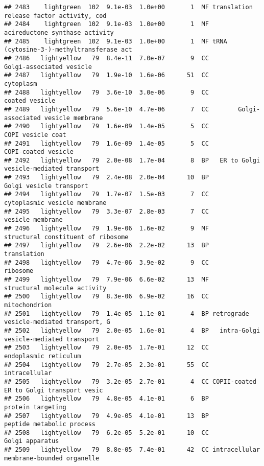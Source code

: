 \documentclass[]{article}
\begin{document}
\begin{verbatim}
## 2483    lightgreen  102  9.1e-03  1.0e+00       1  MF translation release factor activity, cod
## 2484    lightgreen  102  9.1e-03  1.0e+00       1  MF           acireductone synthase activity
## 2485    lightgreen  102  9.1e-03  1.0e+00       1  MF tRNA (cytosine-3-)-methyltransferase act
## 2486   lightyellow   79  8.4e-11  7.0e-07       9  CC                 Golgi-associated vesicle
## 2487   lightyellow   79  1.9e-10  1.6e-06      51  CC                                cytoplasm
## 2488   lightyellow   79  3.6e-10  3.0e-06       9  CC                           coated vesicle
## 2489   lightyellow   79  5.6e-10  4.7e-06       7  CC        Golgi-associated vesicle membrane
## 2490   lightyellow   79  1.6e-09  1.4e-05       5  CC                        COPI vesicle coat
## 2491   lightyellow   79  1.6e-09  1.4e-05       5  CC                      COPI-coated vesicle
## 2492   lightyellow   79  2.0e-08  1.7e-04       8  BP   ER to Golgi vesicle-mediated transport
## 2493   lightyellow   79  2.4e-08  2.0e-04      10  BP                  Golgi vesicle transport
## 2494   lightyellow   79  1.7e-07  1.5e-03       7  CC             cytoplasmic vesicle membrane
## 2495   lightyellow   79  3.3e-07  2.8e-03       7  CC                         vesicle membrane
## 2496   lightyellow   79  1.9e-06  1.6e-02       9  MF       structural constituent of ribosome
## 2497   lightyellow   79  2.6e-06  2.2e-02      13  BP                              translation
## 2498   lightyellow   79  4.7e-06  3.9e-02       9  CC                                 ribosome
## 2499   lightyellow   79  7.9e-06  6.6e-02      13  MF             structural molecule activity
## 2500   lightyellow   79  8.3e-06  6.9e-02      16  CC                            mitochondrion
## 2501   lightyellow   79  1.4e-05  1.1e-01       4  BP retrograde vesicle-mediated transport, G
## 2502   lightyellow   79  2.0e-05  1.6e-01       4  BP   intra-Golgi vesicle-mediated transport
## 2503   lightyellow   79  2.0e-05  1.7e-01      12  CC                    endoplasmic reticulum
## 2504   lightyellow   79  2.7e-05  2.3e-01      55  CC                            intracellular
## 2505   lightyellow   79  3.2e-05  2.7e-01       4  CC COPII-coated ER to Golgi transport vesic
## 2506   lightyellow   79  4.8e-05  4.1e-01       6  BP                        protein targeting
## 2507   lightyellow   79  4.9e-05  4.1e-01      13  BP                peptide metabolic process
## 2508   lightyellow   79  6.2e-05  5.2e-01      10  CC                          Golgi apparatus
## 2509   lightyellow   79  8.8e-05  7.4e-01      42  CC intracellular membrane-bounded organelle

\end{verbatim}
\end{document}

